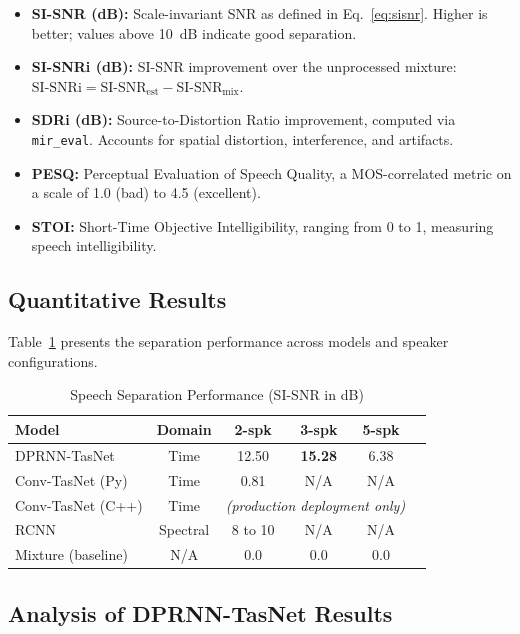 \documentclass[conference]{IEEEtran}
\begin{document}
\begin{itemize}[leftmargin=*,nosep]
    \item \textbf{SI-SNR (dB):} Scale-invariant SNR as defined in Eq.~\eqref{eq:sisnr}. Higher is better; values above 10~dB indicate good separation.
    \item \textbf{SI-SNRi (dB):} SI-SNR improvement over the unprocessed mixture: $\text{SI-SNRi} = \text{SI-SNR}_{\text{est}} - \text{SI-SNR}_{\text{mix}}$.
    \item \textbf{SDRi (dB):} Source-to-Distortion Ratio improvement, computed via \texttt{mir\_eval}. Accounts for spatial distortion, interference, and artifacts.
    \item \textbf{PESQ:} Perceptual Evaluation of Speech Quality, a MOS-correlated metric on a scale of 1.0 (bad) to 4.5 (excellent).
    \item \textbf{STOI:} Short-Time Objective Intelligibility, ranging from 0 to 1, measuring speech intelligibility.
\end{itemize}

\subsection{Quantitative Results}

Table~\ref{tab:results} presents the separation performance across models and speaker configurations.

\begin{table}[t]
\centering
\caption{Speech Separation Performance (SI-SNR in dB)}
\label{tab:results}
\begin{tabular}{@{}lccccc@{}}
\toprule
\textbf{Model} & \textbf{Domain} & \textbf{2-spk} & \textbf{3-spk} & \textbf{5-spk} \\
\midrule
DPRNN-TasNet & Time & 12.50 & \textbf{15.28} & 6.38 \\
Conv-TasNet (Py) & Time & 0.81 & N/A & N/A \\
Conv-TasNet (C++) & Time & \multicolumn{3}{c}{\textit{(production deployment only)}} \\
RCNN & Spectral & 8 to 10 & N/A & N/A \\
\midrule
Mixture (baseline) & N/A & 0.0 & 0.0 & 0.0 \\
\bottomrule
\end{tabular}
\end{table}

\subsection{Analysis of DPRNN-TasNet Results}
\end{document}
